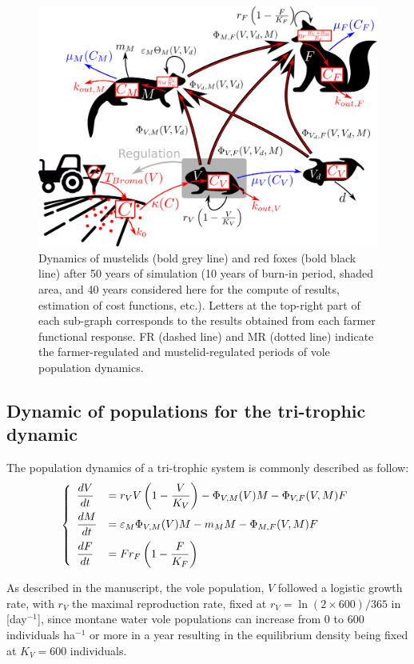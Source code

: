 \documentclass[11pt]{article}
\begin{document}

\begin{figure}
	\begin{center}
		\includegraphics[width=.8\linewidth]{img/system_scheme.png}
		\caption{Dynamics of mustelids (bold grey line) and red foxes (bold black line) after 50 years of simulation (10 years of burn-in period, shaded area, and 40 years considered here for the compute of results, estimation of 
			cost functions, etc.). Letters at the top-right part of each sub-graph corresponds to the results obtained from each farmer functional response. FR (dashed line) and MR (dotted line) indicate the farmer-regulated and mustelid-regulated periods of vole population dynamics.}
		\label{fig:scheme}
	\end{center}
\end{figure}


\subsection{Dynamic of populations for the tri-trophic dynamic}
%
The population dynamics of a tri-trophic system is commonly described as follow:
\begin{equation}
\left\{
\begin{array}{l l}
\dfrac{dV}{dt} & =  r_V V \left( 1- \dfrac{V}{K_V}\right) - \Phi_{V,M}(V)M - \Phi_{V,F}(V,M)F\\[.3cm]
%
\dfrac{dM}{dt} & = \varepsilon_M \Phi_{V,M}(V)M - m_M M - \Phi_{M,F}(V,M)F\\[.3cm]
%
\dfrac{dF}{dt} & = F r_F \left( 1- \dfrac{F}{K_F}\right)
\end{array}
\right.
\label{eq:simpleSystem}
\end{equation}

As described in the manuscript, the vole population, $V$ followed a logistic growth rate, with $r_V$  the maximal reproduction rate, fixed at $r_V = \ln(2 \times 600)/365$ in [day$^{-1}$], since montane water vole populations can increase from 0  to  600 individuals ha$^{-1}$ or more in a year \citep{Giraudoux1997} resulting in the equilibrium density being fixed at $K_V = 600$ individuals. 
\end{document}
